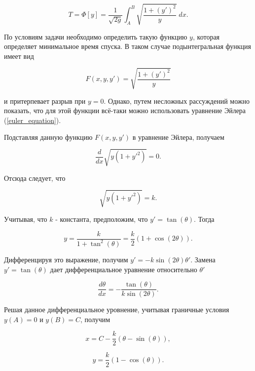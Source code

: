 \documentclass{article}
\begin{document}
\begin{displaymath}
	T = \Phi[y] = \frac{1}{\sqrt{2g}} \int_{A}^{B} \sqrt{\frac{1 + (y')^2}{y}} \; dx.
\end{displaymath}

\noindent По условиям задачи необходимо определить такую функцию $y$, которая определяет минимальное время спуска. В таком случае подынтегральная функция имеет вид

\begin{displaymath}
	F(x, y, y') = \sqrt{\frac{1 + (y')^2}{y}}
\end{displaymath}

\noindent и притерпевает разрыв при $y = 0$. Однако, путем несложных рассуждений можно показать, что для этой функции всё-таки можно использовать уравнение Эйлера (\ref{euler_equation}).

Подставляя данную функцию $F(x, y, y')$ в уравнение Эйлера, получаем

\begin{displaymath}
	\frac{d}{dx} \sqrt{y (1+y'^2)} = 0.
\end{displaymath}

\noindent Отсюда следует, что

\begin{displaymath}
	\sqrt{y (1+y'^2)} = k.
\end{displaymath}

\noindent Учитывая, что $k$ - константа, предположим, что $y' = \tan(\theta)$. Тогда

\begin{displaymath}
	y = \frac{k}{1 + \tan^2(\theta)} = \frac{k}{2}(1 + \cos(2\theta)).
\end{displaymath}

\noindent Дифференцируя это выражение, получим $y' = -k \sin(2\theta) \theta'$. Замена $y' = \tan(\theta)$ дает дифференциальное уравнение относительно $\theta'$

\begin{displaymath}
	\frac{d \theta}{dx} = - \frac{\tan(\theta)}{k \sin(2\theta)}.
\end{displaymath}

\noindent Решая данное дифференциальное уровнение, учитывая граничные условия $y(A) = 0$ и $y(B) = C$, получим

\begin{displaymath}
	x = C - \frac{k}{2}(\theta - \sin(\theta)),
\end{displaymath}

\begin{displaymath}
	y = \frac{k}{2}(1 - \cos(\theta)).
\end{displaymath}
\end{document}

